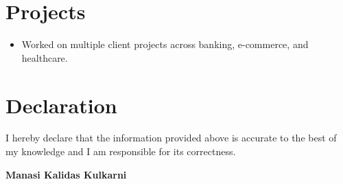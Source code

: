 \documentclass[letterpaper, 11pt]{article}
\newcommand{\resumeItem}[1]{\item \small {#1 \vspace{-3pt}}}
\newcommand{\resumeItemListStart}{\begin{itemize}[leftmargin=0.25in, label={\textbullet}]}
\newcommand{\resumeItemListEnd}{\end{itemize}\vspace{-10pt}}
\begin{document}
\section*{Projects}
\resumeItemListStart{}
    \resumeItem{Worked on multiple client projects across banking, e-commerce, and healthcare.}
\resumeItemListEnd{}

\section*{Declaration}
I hereby declare that the information provided above is accurate to the best of my knowledge and I am responsible for its correctness.

\vspace{10pt}
\textbf{Manasi Kalidas Kulkarni}
\end{document}
